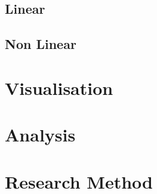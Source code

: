 \subsection{Linear}
\subsection{Non Linear}

\section{Visualisation}

\section{Analysis}

\section{Research Method}

